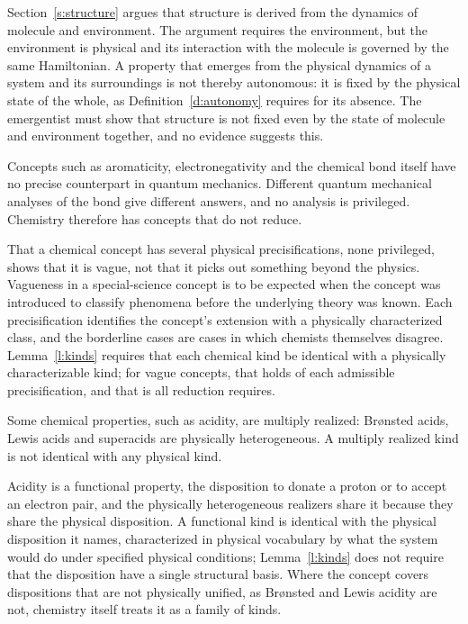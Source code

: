 \documentclass{situationist-preprint}
\begin{document}
\begin{reply}
Section~\ref{s:structure} argues that structure is derived from the dynamics of molecule and environment. The argument requires the environment, but the environment is physical and its interaction with the molecule is governed by the same Hamiltonian. A property that emerges from the physical dynamics of a system and its surroundings is not thereby autonomous: it is fixed by the physical state of the whole, as Definition~\ref{d:autonomy} requires for its absence. The emergentist must show that structure is not fixed even by the state of molecule and environment together, and no evidence suggests this.
\end{reply}

\begin{objection}\label{o:concepts}
Concepts such as aromaticity, electronegativity and the chemical bond itself have no precise counterpart in quantum mechanics. Different quantum mechanical analyses of the bond give different answers, and no analysis is privileged. Chemistry therefore has concepts that do not reduce.
\end{objection}

\begin{reply}
That a chemical concept has several physical precisifications, none privileged, shows that it is vague, not that it picks out something beyond the physics. Vagueness in a special-science concept is to be expected when the concept was introduced to classify phenomena before the underlying theory was known. Each precisification identifies the concept's extension with a physically characterized class, and the borderline cases are cases in which chemists themselves disagree. Lemma~\ref{l:kinds} requires that each chemical kind be identical with a physically characterizable kind; for vague concepts, that holds of each admissible precisification, and that is all reduction requires.
\end{reply}

\begin{objection}\label{o:multiple}
Some chemical properties, such as acidity, are multiply realized: Brønsted acids, Lewis acids and superacids are physically heterogeneous. A multiply realized kind is not identical with any physical kind.
\end{objection}

\begin{reply}
Acidity is a functional property, the disposition to donate a proton or to accept an electron pair, and the physically heterogeneous realizers share it because they share the physical disposition. A functional kind is identical with the physical disposition it names, characterized in physical vocabulary by what the system would do under specified physical conditions; Lemma~\ref{l:kinds} does not require that the disposition have a single structural basis. Where the concept covers dispositions that are not physically unified, as Brønsted and Lewis acidity are not, chemistry itself treats it as a family of kinds.
\end{reply}
\end{document}

